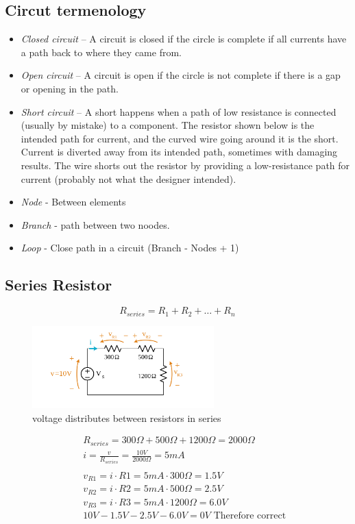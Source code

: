 \documentclass{article}
\begin{document}
\subsection{Circut termenology}
\begin{itemize}
    \item \textit{Closed circuit} – A circuit is closed if the circle is complete if all currents have a path back to where they came from.
    \item \textit{Open circuit} – A circuit is open if the circle is not complete if there is a gap or opening in the path.
    \item \textit{Short circuit} – A short happens when a path of low resistance is connected (usually by mistake) to a component. The resistor shown below is the intended path for current, and the curved wire going around it is the short. Current is diverted away from its intended path, sometimes with damaging results. The wire shorts out the resistor by providing a low-resistance path for current (probably not what the designer intended).
    \item \textit{Node} - Between elements
    \item \textit{Branch} - path between two noodes.
    \item \textit{Loop} - Close path in a circuit  (Branch - Nodes + 1)
\end{itemize}

\subsection{Series Resistor}
\begin{equation} R_{series} = R_1 + R_2 + \ldots + R_n \end{equation}

\begin{figure}[h]
    \vspace{10mm}
    \centering
    \includegraphics[width=7cm]{image/voltage-distributes-between-resistors-in-series.png}
    \caption{voltage distributes between resistors in series}
\end{figure}


\begin{align*}
  &\quad R_{series} = 300\Omega + 500\Omega + 1200\Omega = 2000\Omega \\
  &\quad i = \frac{v}{R_{series}} = \frac{10V}{2000\Omega} = 5mA \\
  &\quad \\
  &\quad v_{R1} = i\cdot R1 = 5mA\cdot 300\Omega = 1.5V \\
  &\quad v_{R2} = i\cdot R2 = 5mA\cdot 500\Omega = 2.5V \\
  &\quad v_{R3} = i\cdot R3 = 5mA\cdot 1200\Omega = 6.0V \\
  &\quad 10V -1.5V -2.5V -6.0V = 0V \text{ Therefore correct }\\
\end{align*}
\end{document}
